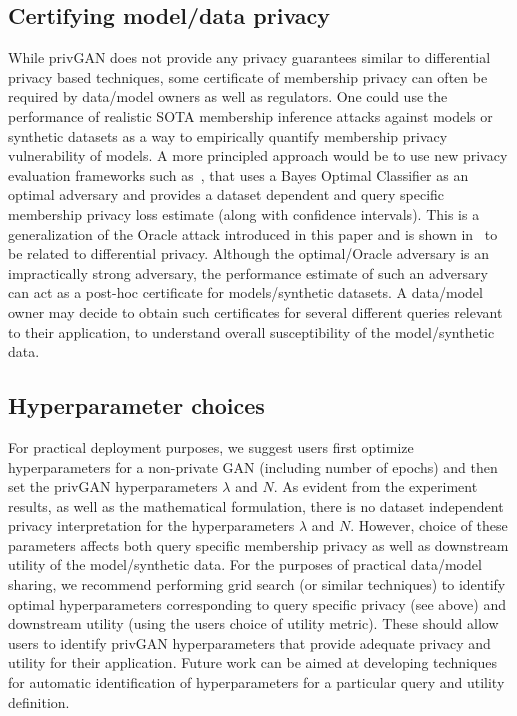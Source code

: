 \documentclass{article}
\begin{document}
\subsection{Certifying model/data privacy}
While privGAN does not provide any privacy guarantees similar to differential privacy based techniques, some certificate of membership privacy can often be required by data/model owners as well as regulators. One could use the performance of realistic SOTA membership inference attacks against models or synthetic datasets as a way to empirically quantify membership privacy vulnerability of models. A more principled approach would be to use new privacy evaluation frameworks such as~\cite{liu2020mace}, that uses a Bayes Optimal Classifier as an optimal adversary and provides a dataset dependent and query specific membership privacy loss estimate (along with confidence intervals). This is a generalization of the Oracle attack introduced in this paper and is shown in~\cite{liu2020mace} to be related to differential privacy. Although the optimal/Oracle adversary is an impractically strong adversary, the performance estimate of such an adversary can act as a post-hoc certificate for models/synthetic datasets. A data/model owner may decide to obtain such certificates for several different queries relevant to their application, to understand overall susceptibility of the model/synthetic data.

\subsection{Hyperparameter choices}
For practical deployment purposes, we suggest users first optimize hyperparameters for a non-private GAN (including number of epochs) and then set the privGAN hyperparameters $\lambda$ and $N$. As evident from the experiment results, as well as the mathematical formulation, there is no dataset independent privacy interpretation for the hyperparameters $\lambda$ and $N$.  However, choice of these parameters affects both query specific membership privacy as well as downstream utility of the model/synthetic data. For the purposes of practical data/model sharing, we recommend performing grid search (or similar techniques) to identify optimal hyperparameters corresponding to query specific privacy (see above) and downstream utility (using the users choice of utility metric). These should allow users to identify privGAN hyperparameters that provide adequate privacy and utility for their application. Future work can be aimed at developing techniques for automatic identification of hyperparameters for a particular query and utility definition.   
\end{document}
